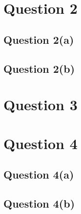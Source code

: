 \documentclass[a4paper]{article}
\begin{document}
\section*{Question 2}
\subsection*{Question 2(a)}
\subsection*{Question 2(b)}
\section*{Question 3}
\section*{Question 4}
\subsection*{Question 4(a)}
\subsection*{Question 4(b)}
\end{document}
